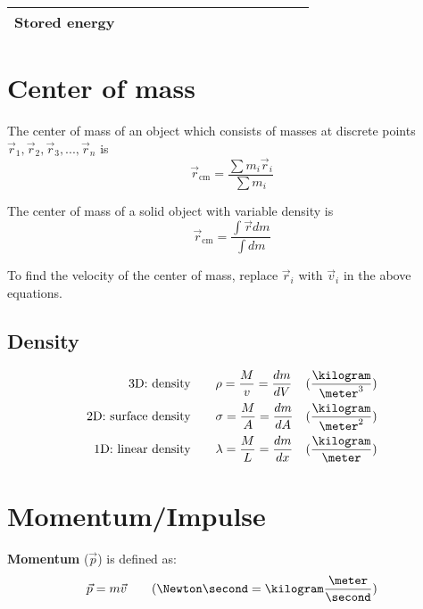 \begin{tabular}{|>{\RaggedRight}p{0.38225\linewidth}|>{\RaggedRight}p{0.23286\linewidth}|>{\RaggedRight}p{0.23286\linewidth}|}
	\\ \hline \hspace*{0pt}\ignorespaces{}\hspace*{0pt}Stored energy&\hspace*{0pt}\ignorespaces{}\hspace*{0pt}{${\displaystyle E_{\mathrm {eq} }=E_{1}+E_{2}}$}&\hspace*{0pt}\ignorespaces{}\hspace*{0pt}{${\displaystyle E_{\mathrm {eq} }=E_{1}+E_{2}}$}\\ \hline 
\end{tabular}

\section{Center of mass}

The center of mass of an object which consists of masses at discrete points $\vec{r}_1, \vec{r}_2, \vec{r}_3, ..., \vec{r}_n$ is
\[
	\vec{r}_\text{cm} = \frac{\sum m_i \vec{r}_i}{\sum m_i}
\]

The center of mass of a solid object with variable density is
\[
	\vec{r}_\text{cm} = \frac{\int \vec{r} dm}{\int dm}
\]

To find the velocity of the center of mass, replace $\vec{r}_i$ with $\vec{v}_i$ in the above equations.

\subsection{Density}

\begin{align*}
	\text{3D: density} \qquad & \rho = \frac{M}{v} = \frac{dm}{dV} & (\frac{\kilogram}{\meter^3}) \\
	\text{2D: surface density} \qquad & \sigma = \frac{M}{A} = \frac{dm}{dA} & (\frac{\kilogram}{\meter^2}) \\
	\text{1D: linear density} \qquad & \lambda = \frac{M}{L} = \frac{dm}{dx} & (\frac{\kilogram}{\meter}) \\
\end{align*}

\section{Momentum/Impulse}

\begin{definition}[Momentum] \textbf{Momentum} ($\vec{p}$) is defined as:
	\[
		\vec{p} = m \vec{v} \qquad (\Newton \second = \kilogram \frac{\meter}{\second})
	\]
\end{definition}

